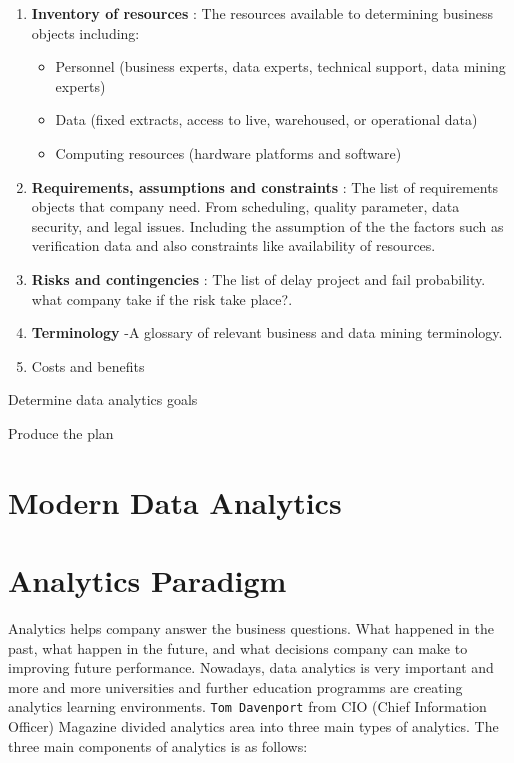 \documentclass[]{book}
\providecommand{\tightlist}{%
  \setlength{\itemsep}{0pt}\setlength{\parskip}{0pt}}
\begin{document}
\begin{enumerate}
\def\labelenumi{\arabic{enumi}.}
\item
  \textbf{Inventory of resources }: The resources available to
  determining business objects including:

  \begin{itemize}
  \tightlist
  \item
    Personnel (business experts, data experts, technical support, data
    mining experts)
  \item
    Data (fixed extracts, access to live, warehoused, or operational
    data)
  \item
    Computing resources (hardware platforms and software)
  \end{itemize}
\item
  \textbf{Requirements, assumptions and constraints }: The list of
  requirements objects that company need. From scheduling, quality
  parameter, data security, and legal issues. Including the assumption
  of the the factors such as verification data and also constraints like
  availability of resources.
\item
  \textbf{Risks and contingencies }: The list of delay project and fail
  probability. what company take if the risk take place?.
\item
  \textbf{Terminology }-A glossary of relevant business and data mining
  terminology.
\item
  Costs and benefits
\end{enumerate}

Determine data analytics goals

Produce the plan

\section{Modern Data Analytics}\label{modern-data-analytics}

\section{Analytics Paradigm}\label{analytics-paradigm}

Analytics helps company answer the business questions. What happened in
the past, what happen in the future, and what decisions company can make
to improving future performance. Nowadays, data analytics is very
important and more and more universities and further education programms
are creating analytics learning environments. \texttt{Tom\ Davenport}
from CIO (Chief Information Officer) Magazine divided analytics area
into three main types of analytics. The three main components of
analytics is as follows:
\end{document}
